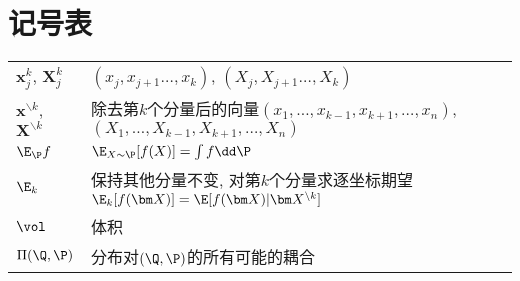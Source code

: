 \section*{记号表}

\begin{tabular}{p{} p{}}
\hline
	$\bm x_j^k$, $\bm X_j^k$ & $(x_j, x_{j+1} \dots, x_k)$, $(X_j, X_{j+1} \dots, X_k)$ \\
	$\bm x^{\backslash k}$, $\bm X^{\backslash k}$ & 除去第$k$个分量后的向量$(x_1, \dots, x_{k-1}, x_{k+1}, \dots, x_n)$, $(X_1, \dots, X_{k-1}, X_{k+1}, \dots, X_n)$ \\
	$\E_{\P} f$ & $\E_{X \sim \P} [f(X)] = \int f \dd \P$ \\
	$\E_k$ & 保持其他分量不变, 对第$k$个分量求逐坐标期望$\E_k[f(\bm X)] = \E[f(\bm X) | \bm X^{\backslash k}]$ \\
	$\vol$ & 体积 \\
	$\Pi(\Q, \P)$ & 分布对$(\Q, \P)$的所有可能的耦合 \\
\hline
\end{tabular}
